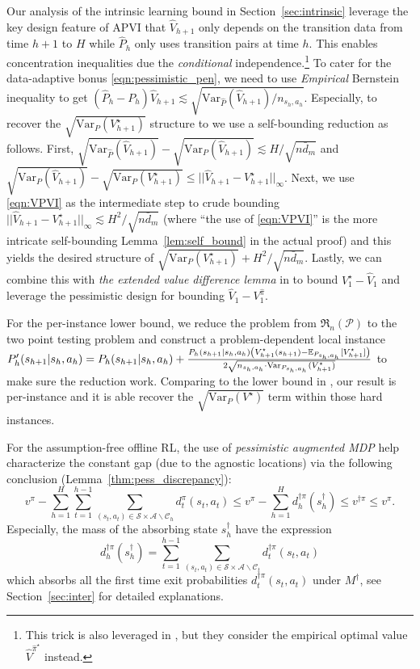 Our analysis of the intrinsic learning bound in Section~\ref{sec:intrinsic} leverage the key design feature of APVI that $\widehat{V}_{h+1}$ only depends on the transition data from time $h+1$ to $H$ while $\widehat{P}_h$ only uses transition pairs at time $h$. This enables concentration inequalities due the \emph{conditional} independence.\footnote{This trick is also leveraged in \cite{yin2021near}, but they consider the empirical optimal value $\widehat{V}^{\widehat{\pi}^\star}$ instead.} To cater for the data-adaptive bonus \eqref{eqn:pessimistic_pen}, we need to use \emph{Empirical} Bernstein inequality to get {\small$(\widehat{P}_h-P_h)\widehat{V}_{h+1}\lesssim \sqrt{{\mathrm{Var}_{\hat{P}}(\widehat{V}_{h+1})}/{n_{s_h,a_h}}}$}. Especially, to recover the {\small$\sqrt{\mathrm{Var}_P(V^\star_{h+1})}$} structure to we use a self-bounding reduction as follows. First, {\small$\sqrt{{\mathrm{Var}_{\hat{P}}(\widehat{V}_{h+1})}}-\sqrt{\mathrm{Var}_P(\widehat{V}_{h+1})}\lesssim H/\sqrt{n\bar{d}_m}$} and {\small$\sqrt{\mathrm{Var}_P(\widehat{V}_{h+1})}-\sqrt{\mathrm{Var}_P({V}^\star_{h+1})}\leq ||\widehat{V}_{h+1}-V^\star_{h+1}||_\infty$}. Next, we use \eqref{eqn:VPVI} as the intermediate step to crude bounding  {\small$||\widehat{V}_{h+1}-V^\star_{h+1}||_\infty\lesssim H^2/\sqrt{n\bar{d}_m}$} (where ``the use of \eqref{eqn:VPVI}'' is the more intricate self-bounding Lemma~\ref{lem:self_bound} in the actual proof) and this yields the desired structure of {\small$\sqrt{\mathrm{Var}_P({V}^\star_{h+1})}+H^2/\sqrt{n\bar{d}_m}$}. Lastly, we can combine this with \emph{the extended value difference lemma} in \cite{cai2020provably} to bound $V_1^\star-\widehat{V}_1$ and leverage the pessimistic design for bounding $\widehat{V}_1-V_1^{\widehat{\pi}}$. 


For the per-instance lower bound, we reduce the problem from $\mathfrak{R}_{n}(\mathcal{P})$ to the two point testing problem and construct a problem-dependent local instance {\small$P'_h(s_{h+1}|s_h,a_h)=P_h(s_{h+1}|s_h,a_h)+\frac{P_h(s_{h+1}|s_h,a_h)\left(V_{h+1}^\star(s_{h+1})-\mathbb{E}_{P_{s_h,a_h}}[V_{h+1}^\star]\right)}{2\sqrt{n_{s_h,a_h}\cdot \mathrm{Var}_{P_{s_h,a_h}}(V_{h+1}^\star)}}$} to make sure the reduction work. Comparing to the lower bound in \cite{jin2020pessimism}, our result is per-instance and it is able recover the $\sqrt{\mathrm{Var}_P(V^\star)}$ term within those hard instances.

For the assumption-free offline RL, the use of \emph{pessimistic augmented MDP} help characterize the constant gap (due to the agnostic locations) via the following conclusion (Lemma~\ref{thm:pess_discrepancy}): 
\[
v^\pi-\sum_{h=1}^H\sum_{t=1}^{h-1}\sum_{(s_t,a_t)\in\mathcal{S}\times\mathcal{A}\backslash \mathcal{C}_h}d^\pi_t(s_t,a_t)\leq v^\pi-\sum_{h=1}^Hd^{\dagger\pi}_h(s^\dagger_h)\leq v^{\dagger\pi}\leq v^\pi.
\]
Especially, the mass of the absorbing state $s^\dagger_h$ have the expression
\[
d^{\dagger\pi}_h(s^\dagger_h)=\sum_{t=1}^{h-1}\sum_{(s_t,a_t)\in\mathcal{S}\times\mathcal{A}\backslash\mathcal{C}_t}d^{\dagger\pi}_t(s_t,a_t)
\]
which absorbs all the first time exit probabilities $d^{\dagger\pi}_t(s_t,a_t)$ under $M^\dagger$, see Section~\ref{sec:inter} for detailed explanations.




